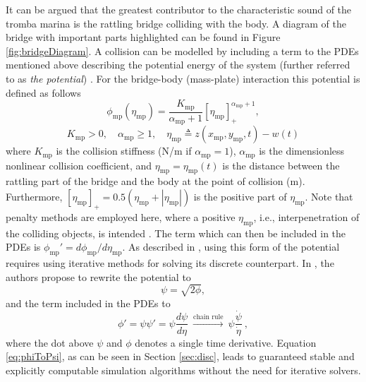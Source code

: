 \documentclass[dvipsnames, pdftex]{article}
\def\SWcomment[#1]{\textcolor{Bittersweet}{#1}}
\def\MDcomment[#1]{\textcolor{Blue}{#1}}
\def\um{w}
\def\up{z}
\begin{document}
%
It can be argued that the greatest contributor to the characteristic sound of the tromba marina is the rattling bridge colliding with the body. A diagram of the bridge with important parts highlighted can be found in Figure \ref{fig:bridgeDiagram}. A collision can be modelled by including a term to the PDEs mentioned above describing the potential energy of the system (further referred to as \textit{the potential}) \cite{Ducceschi2019}. For the bridge-body (mass-plate) interaction this potential is defined as follows %
\begin{equation}\label{eq:potential}
    \phi_\text{mp}(\eta_\text{mp}) = \frac{K_\text{mp}}{\alpha_\text{mp}+1}[\eta_\text{mp}]_+^{\alpha_\text{mp}+1},
\end{equation}
\begin{equation*}
    K_\text{mp}>0, \quad \alpha_\text{mp}\geq 1, \quad \eta_\text{mp}\triangleq \up(x_\text{mp},y_\text{mp},t) - \um(t)
\end{equation*}
where $K_\text{mp}$ is the collision stiffness (N/m if $\alpha_\text{mp} = 1$), $\alpha_\text{mp}$ is the dimensionless nonlinear collision coefficient, and $\eta_\text{mp} = \eta_\text{mp}(t)$ is the distance between the rattling part of the bridge and the body at the point of collision (m). Furthermore, $[\eta_\text{mp}]_+ = 0.5(\eta_\text{mp}+|\eta_\text{mp}|)$ is the positive part of $\eta_\text{mp}$. Note that penalty methods are employed here, where a positive $\eta_\text{mp}$, i.e., interpenetration of the colliding objects, is intended \cite{bilbao2014:SMC2020}. The term which can then be included in the PDEs is $\phi_\text{mp}' = d\phi_\text{mp}/d\eta_\text{mp}$. As described in \cite{Falaize2016a:SMC2020, Falaize2016b:SMC2020, Lopes:SMC2020, Ducceschi2019}, using this form of the potential requires using iterative methods for solving its discrete counterpart. In \cite{Ducceschi2019}, the authors propose to rewrite the potential to
\begin{equation}
    \psi = \sqrt{2\phi},
\end{equation}
and the term included in the PDEs to
\begin{equation}\label{eq:phiToPsi}
    \phi' = \psi\psi' = \psi\frac{d\psi}{d\eta}\  \xrightarrow{\text{chain rule}}\ \psi\frac{\dot \psi}{\dot \eta}\ ,
\end{equation}
where the dot above $\psi$ and $\phi$ denotes a single time derivative. Equation \eqref{eq:phiToPsi}, as can be seen in Section \ref{sec:disc}, leads to guaranteed stable and explicitly computable simulation algorithms without the need for iterative solvers. 
\end{document}
